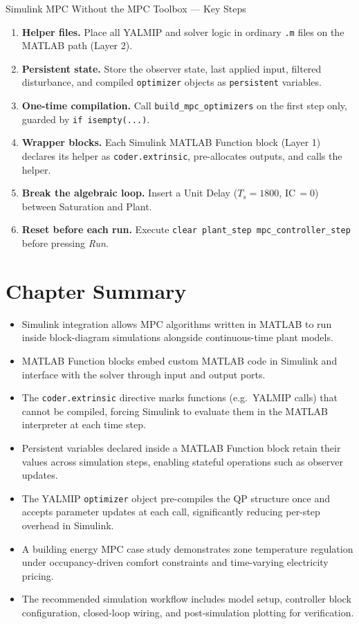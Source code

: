 \begin{summarybox}{Simulink MPC Without the MPC Toolbox — Key Steps}
	\begin{enumerate}[noitemsep]
		\item \textbf{Helper files.}  Place all YALMIP and solver logic in
		ordinary \texttt{.m} files on the MATLAB path (Layer 2).
		\item \textbf{Persistent state.}  Store the observer state, last
		applied input, filtered disturbance, and compiled
		\texttt{optimizer} objects as \texttt{persistent} variables.
		\item \textbf{One-time compilation.}  Call
		\texttt{build\_mpc\_optimizers} on the first step only,
		guarded by \texttt{if isempty(...)}.
		\item \textbf{Wrapper blocks.}  Each Simulink MATLAB Function block
		(Layer 1) declares its helper as \texttt{coder.extrinsic},
		pre-allocates outputs, and calls the helper.
		\item \textbf{Break the algebraic loop.}  Insert a Unit Delay
		($T_s = 1800$, IC\,$= 0$) between Saturation and Plant.
		\item \textbf{Reset before each run.}  Execute
		\texttt{clear plant\_step mpc\_controller\_step} before
		pressing \textit{Run}.
	\end{enumerate}
\end{summarybox}

\section*{Chapter Summary}
\begin{itemize}
    \item Simulink integration allows MPC algorithms written in MATLAB to run inside block-diagram simulations alongside continuous-time plant models.
    \item MATLAB Function blocks embed custom MATLAB code in Simulink and interface with the solver through input and output ports.
    \item The \texttt{coder.extrinsic} directive marks functions (e.g.\ YALMIP calls) that cannot be compiled, forcing Simulink to evaluate them in the MATLAB interpreter at each time step.
    \item Persistent variables declared inside a MATLAB Function block retain their values across simulation steps, enabling stateful operations such as observer updates.
    \item The YALMIP \texttt{optimizer} object pre-compiles the QP structure once and accepts parameter updates at each call, significantly reducing per-step overhead in Simulink.
    \item A building energy MPC case study demonstrates zone temperature regulation under occupancy-driven comfort constraints and time-varying electricity pricing.
    \item The recommended simulation workflow includes model setup, controller block configuration, closed-loop wiring, and post-simulation plotting for verification.
\end{itemize}

